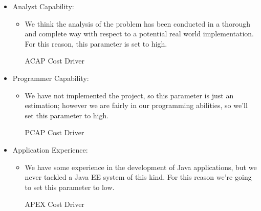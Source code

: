 \begin{itemize}
	\item Analyst Capability: 
	\begin{itemize}
	\item[] We think the analysis of the problem has been conducted in a thorough and complete way with respect to a potential real world implementation. For this reason, this parameter is set to high.
	\begin{costdriverstable}{ACAP Cost Driver}
		\hline
	\end{costdriverstable}
	\end{itemize}
\end{itemize}

\begin{itemize}
	\item Programmer Capability: 
	\begin{itemize}
	\item[] We have not implemented the project, so this parameter is just an estimation; however we are fairly in our programming abilities, so we'll set this parameter to high.
	\begin{costdriverstable}{PCAP Cost Driver}
		\hline
	\end{costdriverstable}
	\end{itemize}
\end{itemize}

\begin{itemize}
	\item Application Experience: 
	\begin{itemize}
	\item[] We have some experience in the development of Java applications, but we never tackled a Java EE system of this kind. For this reason we're going to set this parameter to low. 
	\begin{costdriverstable}{APEX Cost Driver}
		\hline
	\end{costdriverstable}
	\end{itemize}
\end{itemize}

